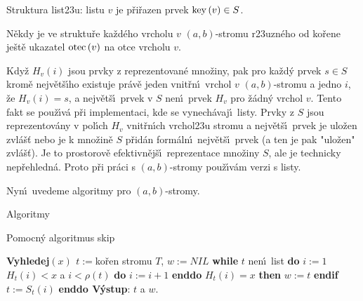 \flushpar Struktura list\accent23u:\newline 
listu $v$ je p\v ri\v razen prvek $\operatorname{key}\left(v\right)\in S$.
\medskip

\flushpar N\v ekdy je ve struktu\v re ka\v zd\'eho vrcholu $v$ 
$\left(a,b\right)$-stromu r\accent23uzn\'eho od ko\v rene je\v st\v e ukazatel 
$\operatorname{otec}\left(v\right)$ na otce vrcholu $v$.
\medskip

\flushpar Kdy\v z $H_v\left(i\right)$ jsou prvky z reprezentovan\'e 
mno\v ziny, pak pro ka\v zd\'y prvek $s\in S$ krom\v e nejv\v et\v s\'\i ho 
existuje pr\'av\v e jeden vnit\v r\-n\'\i\ vrchol $v$ $\left(a,b\right)$-stromu 
a jedno $i$, \v ze $H_v\left(i\right)=s$, a nejv\v et\v s\'\i\ prvek v $S$ nen\'\i\ prvek 
$H_v$ pro \v z\'adn\'y vrchol $v$. Tento fakt se pou\v z\'\i v\'a p\v ri 
implementaci, kde se vynech\'avaj\'\i\ listy. Prvky z $S$ jsou 
reprezentov\'any v pol\'\i ch $H_v$ vnit\v r\-n\'\i ch vrchol\accent23u 
stromu 
a nejv\v et\v s\'\i\ prvek je ulo\v zen zvl\'a\v s\v t nebo je k mno\v zin\v e $S$ p\v rid\'an 
form\'aln\'\i\ nejv\v et\v s\'\i\ prvek (a ten je pak "ulo\v zen" zvl\'a\v s\v t). Je to prostorov\v e 
efektivn\v ej\v s\'\i\ reprezentace mno\v ziny $S$, ale je technicky 
nep\v rehledn\'a. Proto p\v ri pr\'aci s $\left(a,b\right)$-stromy pou\v z\'\i v\'am 
verzi s listy.
\medskip

\flushpar Nyn\'\i\ uvedeme algoritmy pro $\left(a,b\right)$-stromy.

\subhead 
Algoritmy
\endsubhead

\flushpar Pomocn\'y algoritmus
skip

{\bf Vyhledej$\left(x\right)$\newline 
$t:=$}ko\v ren stromu $T$, $w:=NIL$\newline 
{\bf while} $t$ nen\'\i\ list {\bf do}\newline 
\phantom{---}$i:=1$\newline 
\phantom{---}{\bf while} $H_t\left(i\right)<x$ a $i<\rho \left(t\right)$ {\bf do} $i:=i+1$ {\bf enddo}\newline 
\phantom{---}{\bf if} $H_t\left(i\right)=x$ {\bf then} $w:=t$ {\bf endif}\newline 
$t:=S_t\left(i\right)$ {\bf enddo V\'ystup}: $t$ a $w$.
\medskip

